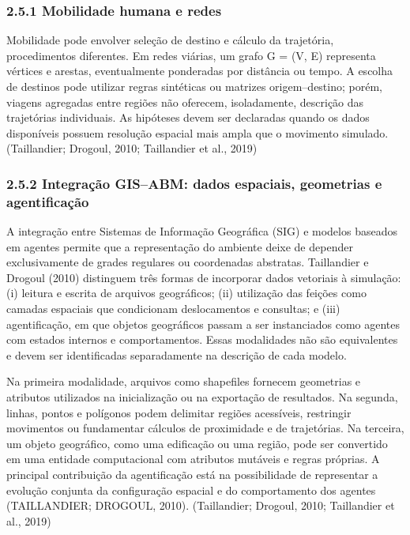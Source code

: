 \subsubsection{2.5.1 Mobilidade humana e
redes}\label{mobilidade-humana-e-redes}

Mobilidade pode envolver seleção de destino e cálculo da trajetória,
procedimentos diferentes. Em redes viárias, um grafo G = (V, E)
representa vértices e arestas, eventualmente ponderadas por distância ou
tempo. A escolha de destinos pode utilizar regras sintéticas ou matrizes
origem--destino; porém, viagens agregadas entre regiões não oferecem,
isoladamente, descrição das trajetórias individuais. As hipóteses devem
ser declaradas quando os dados disponíveis possuem resolução espacial
mais ampla que o movimento simulado. (Taillandier; Drogoul, 2010;
Taillandier et al., 2019)

\subsubsection{2.5.2 Integração GIS--ABM: dados espaciais, geometrias e
agentificação}\label{integrauxe7uxe3o-gisabm-dados-espaciais-geometrias-e-agentificauxe7uxe3o}

A integração entre Sistemas de Informação Geográfica (SIG) e modelos
baseados em agentes permite que a representação do ambiente deixe de
depender exclusivamente de grades regulares ou coordenadas abstratas.
Taillandier e Drogoul (2010) distinguem três formas de incorporar dados
vetoriais à simulação: (i) leitura e escrita de arquivos geográficos;
(ii) utilização das feições como camadas espaciais que condicionam
deslocamentos e consultas; e (iii) agentificação, em que objetos
geográficos passam a ser instanciados como agentes com estados internos
e comportamentos. Essas modalidades não são equivalentes e devem ser
identificadas separadamente na descrição de cada modelo.

Na primeira modalidade, arquivos como shapefiles fornecem geometrias e
atributos utilizados na inicialização ou na exportação de resultados. Na
segunda, linhas, pontos e polígonos podem delimitar regiões acessíveis,
restringir movimentos ou fundamentar cálculos de proximidade e de
trajetórias. Na terceira, um objeto geográfico, como uma edificação ou
uma região, pode ser convertido em uma entidade computacional com
atributos mutáveis e regras próprias. A principal contribuição da
agentificação está na possibilidade de representar a evolução conjunta
da configuração espacial e do comportamento dos agentes (TAILLANDIER;
DROGOUL, 2010). (Taillandier; Drogoul, 2010; Taillandier et al., 2019)

